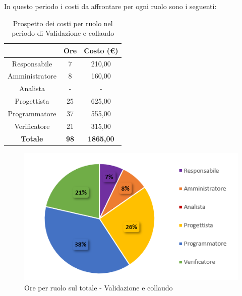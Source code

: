 \pagebreak
   In questo periodo i costi da affrontare per ogni ruolo sono i seguenti:
   
   \begin{table}[H]
       \centering
       \renewcommand{\arraystretch}{1.8}
       \begin{tabular}{c|c|c}
         \rowcolor[HTML]{125E28} 
         \multicolumn{1}{c}{\color[HTML]{FFFFFF}\textbf{Ruolo}}
         & \multicolumn{1}{c}{\color[HTML]{FFFFFF}\textbf{Ore}}
         & \multicolumn{1}{c}{\color[HTML]{FFFFFF}\textbf{Costo (€)}}\\
         \hline
         Responsabile   & 7 & 210,00\\
         Amministratore & 8 & 160,00\\
         Analista       & - & -\\
         Progettista    & 25 & 625,00\\
         Programmatore  & 37 & 555,00\\
         Verificatore   & 21 & 315,00\\
         \textbf{Totale} & \textbf{98} & \textbf{1865,00}
       \end{tabular}
       \caption{Prospetto dei costi per ruolo nel periodo di Validazione e collaudo}
     \end{table}
   
     \begin{figure}[H]
       \centering
        \includegraphics[scale=0.8]{immagini/ore_ruolo_Validazione.png}
        \caption{Ore per ruolo sul totale - Validazione e collaudo}
      \end{figure}
   
